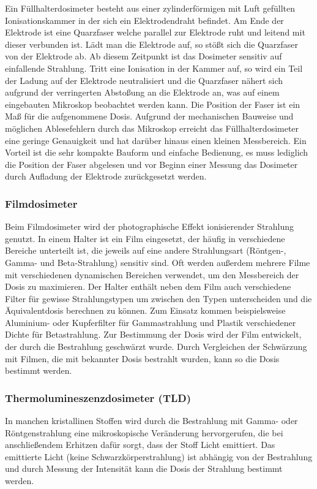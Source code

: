 \documentclass[11pt, a4paper]{article}
\numberwithin{equation}{section}
\begin{document}
Ein Füllhalterdosimeter besteht aus einer zylinderförmigen mit Luft gefüllten Ionisationskammer in der sich ein Elektrodendraht befindet.
Am Ende der Elektrode ist eine Quarzfaser welche parallel zur Elektrode ruht und leitend mit dieser verbunden ist.
Lädt man die Elektrode auf, so stößt sich die Quarzfaser von der Elektrode ab.
Ab diesem Zeitpunkt ist das Dosimeter sensitiv auf einfallende Strahlung.
Tritt eine Ionisation in der Kammer auf, so wird ein Teil der Ladung auf der Elektrode neutralisiert und die Quarzfaser nähert sich aufgrund der verringerten Abstoßung an die Elektrode an, was auf einem eingebauten Mikroskop beobachtet werden kann.
Die Position der Faser ist ein Maß für die aufgenommene Dosis.
Aufgrund der mechanischen Bauweise und möglichen Ablesefehlern durch das Mikroskop erreicht das Füllhalterdosimeter eine geringe Genauigkeit und hat darüber hinaus einen kleinen Messbereich.
Ein Vorteil ist die sehr kompakte Bauform und einfache Bedienung, es muss lediglich die Position der Faser abgelesen und vor Beginn einer Messung das Dosimeter durch Aufladung der Elektrode zurückgesetzt werden.

\subsubsection{Filmdosimeter}
Beim Filmdosimeter wird der photographische Effekt ionisierender Strahlung genutzt.
In einem Halter ist ein Film eingesetzt, der häufig in verschiedene Bereiche unterteilt ist, die jeweils auf eine andere Strahlungsart (Röntgen-, Gamma- und Beta-Strahlung) sensitiv sind.
Oft werden außerdem mehrere Filme mit verschiedenen dynamischen Bereichen verwendet, um den Messbereich der Dosis zu maximieren.
Der Halter enthält neben dem Film auch verschiedene Filter für gewisse Strahlungstypen um zwischen den Typen unterscheiden und die Äquivalentdosis berechnen zu können.
Zum Einsatz kommen beispielsweise Aluminium- oder Kupferfilter für Gammastrahlung und Plastik verschiedener Dichte für Betastrahlung.
Zur Bestimmung der Dosis wird der Film entwickelt, der durch die Bestrahlung geschwärzt wurde.
Durch Vergleichen der Schwärzung mit Filmen, die mit bekannter Dosis bestrahlt wurden, kann so die Dosis bestimmt werden.

\subsubsection{Thermolumineszenzdosimeter (TLD)}
In manchen kristallinen Stoffen wird durch die Bestrahlung mit Gamma- oder Röntgenstrahlung eine mikroskopische Veränderung hervorgerufen, die bei anschließendem Erhitzen dafür sorgt, dass der Stoff Licht emittiert.
Das emittierte Licht (keine Schwarzkörperstrahlung) ist abhängig von der Bestrahlung und durch Messung der Intensität kann die Dosis der Strahlung bestimmt werden.
\end{document}
